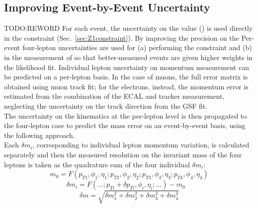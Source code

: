 \subsection{Improving Event-by-Event \mfourl Uncertainty}
\label{sec:ebe}
TODO:REWORD
For each event, the uncertainty on the \mfourl value (\mfourlerr) is used directly in the \Zone constraint (Sec.~\ref{sec:Z1constraint}).
By improving the precision on the \mfourlerr 
Per-event four-lepton uncertainties are used for (a) performing the \Zone constraint and (b) in the measurement of \mH so that better-measured events are given higher weights in the likelihood fit.
Individual lepton uncertainty on momentum measurement can be predicted on a per-lepton 
basis. In the case of muons, the full error matrix is obtained using muon track fit; for the electrons,
instead, the momentum error is estimated from the combination of the ECAL and tracker measurement, 
neglecting the uncertainty on the track direction from the GSF fit. \\
The uncertainty on the kinematics at the per-lepton level is then propagated to the four-lepton case 
to predict the mass error on an event-by-event basis, using the following approach.\\
Each $\delta m_{i}$, corresponding to individual lepton momentum variation, is calculated separately 
and then the measured resolution on the invariant mass of the four leptons is taken as the quadrature sum 
of the four individual $\delta m_{i}$:
\[
m_{0} = F(p_{T1}, \phi_{1},\eta_{1}; p_{T2}, \phi_{2},\eta_{2}; p_{T3}, \phi_{3}, \eta_{3}; p_{T4}, \phi_{4},\eta_{4})
\]
\[\delta m_{i} = F(...; p_{Ti} + \delta p_{Ti}, \phi_{i}, \eta_{i}; ...) - m_{0} \quad
\]
\[
\delta m = \sqrt{\delta m_{1}^2 + \delta m_{2}^2 + \delta m_{3}^2 + \delta m_{4}^2}
\]

